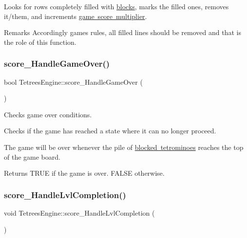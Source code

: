 Looks for rows completely filled with \mbox{\hyperlink{TetreesDefs_8hpp_ad8f0654cf997b7ea7eb14924d0b1ea33}{blocks}}, marks the filled ones, removes it/them, and increments \mbox{\hyperlink{structgame__score__t}{game score multiplier}}.

\begin{DoxyRemark}{Remarks}
Accordingly game\textquotesingle{}s rules, all filled lines should be removed and that is the role of this function. 
\end{DoxyRemark}
\mbox{\label{classTetreesEngine_a31898b1228f8b0381a82871669503b34}} 
\subsubsection{\texorpdfstring{score\+\_\+\+Handle\+Game\+Over()}{score\_HandleGameOver()}}
{\footnotesize\ttfamily bool Tetrees\+Engine\+::score\+\_\+\+Handle\+Game\+Over (\begin{DoxyParamCaption}{ }\end{DoxyParamCaption})\hspace{0.3cm}{\ttfamily [private]}}



Checks game over conditions. 

Checks if the game has reached a state where it can no longer proceed.

The game will be over whenever the pile of \mbox{\hyperlink{classTetreesEngine_a0978ef1f287f00a8ed5a4af2d680b943}{blocked tetrominoes}} reaches the top of the game board. \begin{DoxyReturn}{Returns}
\textquotesingle{}T\+R\+UE\textquotesingle{} if the game is over. \textquotesingle{}F\+A\+L\+SE\textquotesingle{} otherwise. 
\end{DoxyReturn}
\mbox{\label{classTetreesEngine_aa7d501cb6f73111321e1dadbc140ebc8}} 
\subsubsection{\texorpdfstring{score\+\_\+\+Handle\+Lvl\+Completion()}{score\_HandleLvlCompletion()}}
{\footnotesize\ttfamily void Tetrees\+Engine\+::score\+\_\+\+Handle\+Lvl\+Completion (\begin{DoxyParamCaption}{ }\end{DoxyParamCaption})\hspace{0.3cm}{\ttfamily [private]}}



